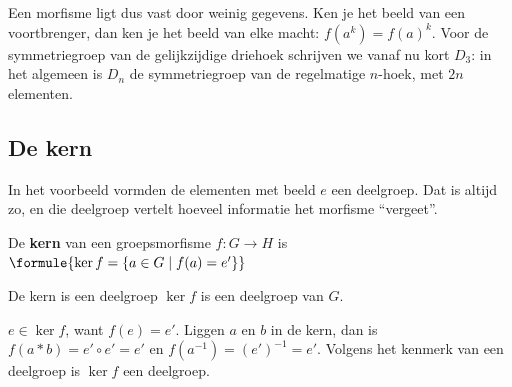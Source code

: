 Een morfisme ligt dus vast door weinig gegevens. Ken je het beeld van een voortbrenger, dan ken je het beeld van elke macht: $f(a^k) = f(a)^k$. Voor de symmetriegroep van de gelijkzijdige driehoek schrijven we vanaf nu kort $D_3$: in het algemeen is $D_n$ de symmetriegroep van de regelmatige $n$-hoek, met $2n$ elementen.



\begin{oefeningen}
\end{oefeningen}

\subsection{De kern}

In het voorbeeld vormden de elementen met beeld $e$ een deelgroep. Dat is altijd zo, en die deelgroep vertelt hoeveel informatie het morfisme ``vergeet''.

\begin{theorie}
De \textbf{\textcolor{accent}{kern}} van een groepsmorfisme $f \colon G \to H$ is \qquad $\formule{\ker f = \{a \in G \mid f(a) = e'\}}$

\begin{stelling}{De kern is een deelgroep}
$\ker f$ is een deelgroep van $G$.
\end{stelling}

\begin{bewijs}
$e \in \ker f$, want $f(e) = e'$. Liggen $a$ en $b$ in de kern, dan is $f(a \ast b) = e' \circ e' = e'$ en $f(a^{-1}) = (e')^{-1} = e'$. Volgens het kenmerk van een deelgroep is $\ker f$ een deelgroep.
\end{bewijs}
\end{theorie}

